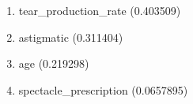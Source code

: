 \begin{enumerate}
\item tear\_production\_rate (0.403509)
\item astigmatic (0.311404)
\item age (0.219298)
\item spectacle\_prescription (0.0657895)
\end{enumerate}